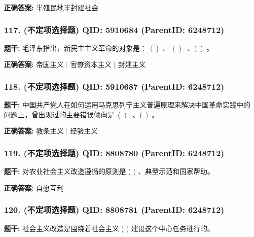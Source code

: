 \documentclass[12pt,UTF8]{ctexart}
\begin{document}
\textbf{正确答案:}
半殖民地半封建社会

\vspace{0.3em}\hrulefill\vspace{0.7em}

\subsubsection*{117. (不定项选择题) \small QID: 5910684 (ParentID: 6248712)}

\textbf{题干:}
毛泽东指出，新民主主义革命的对象是： ( ) 、 ( )  、( ) 。



\textbf{正确答案:}
帝国主义 | 官僚资本主义 | 封建主义

\vspace{0.3em}\hrulefill\vspace{0.7em}

\subsubsection*{118. (不定项选择题) \small QID: 5910687 (ParentID: 6248712)}

\textbf{题干:}
中国共产党人在如何运用马克思列宁主义普遍原理来解决中国革命实践中的问题上，曾出现过的主要错误倾向是 ( )  、( ) 。



\textbf{正确答案:}
教条主义 | 经验主义

\vspace{0.3em}\hrulefill\vspace{0.7em}

\subsubsection*{119. (不定项选择题) \small QID: 8808780 (ParentID: 6248712)}

\textbf{题干:}
对农业社会主义改造遵循的原则是 ( ) 、典型示范和国家帮助。



\textbf{正确答案:}
自愿互利

\vspace{0.3em}\hrulefill\vspace{0.7em}

\subsubsection*{120. (不定项选择题) \small QID: 8808781 (ParentID: 6248712)}

\textbf{题干:}
社会主义改造是围绕着社会主义 ( ) 建设这个中心任务进行的。
\end{document}
